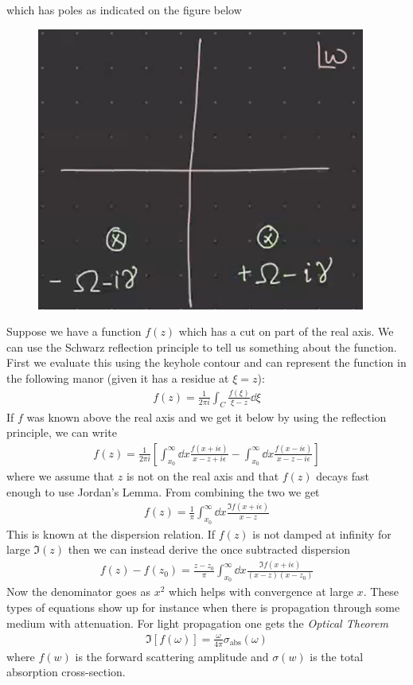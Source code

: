 \documentclass[a4paper,12pt]{article}
\begin{document}
which has poles as indicated on the figure below
\begin{figure}[H]
	\centering
	\includegraphics[width=0.3\linewidth]{23}
	\caption{}
	\label{fig:4}
\end{figure}
Suppose we have a function $f(z)$ which has a cut on part of the real axis. We can use the Schwarz reflection principle to tell us something about the function. First we evaluate this using the keyhole contour and can represent the function in the following manor (given it has a residue at $\xi=z$):
\begin{equation}
\begin{aligned}
f(z)=\frac{1}{2\pi i}\int_C \frac{f(\xi)}{\xi-z}\dd \xi
\end{aligned}
\end{equation}
If $f$ was known above the real axis and we get it below by using the reflection principle, we can write
\begin{equation}
	\begin{aligned}
		f(z)=\frac{1}{2\pi i}\left[\int_{x_0}^{\infty}\dd x \frac{f(x+i\epsilon)}{x-z+i\epsilon}-\int_{x_0}^{\infty}\dd x \frac{f(x-i\epsilon)}{x-z-i\epsilon}\right]
	\end{aligned}
\end{equation}
where we assume that $z$ is not on the real axis and that $f(z)$ decays fast enough to use Jordan's Lemma. From combining the two we get
\begin{equation}
	\begin{aligned}
		f(z)=\frac{1}{\pi}\int_{x_0}^{\infty}\dd x \frac{\Im f(x+i\epsilon)}{x-z}
	\end{aligned}
\end{equation}
This is known at the dispersion relation. If $f(z)$ is not damped at infinity for large $\Im(z)$ then we can instead derive the once subtracted dispersion
\begin{equation}
	\begin{aligned}
		f(z)-f(z_0)=\frac{z-z_0}{\pi}\int_{x_0}^{\infty}\dd x \frac{\Im f(x+i\epsilon)}{(x-z)(x-z_0)}
	\end{aligned}
\end{equation}
Now the denominator goes as $x^2$ which helps with convergence at large $x$. These types of equations show up for instance when there is propagation through some medium with attenuation. For light propagation one gets the \textit{Optical Theorem}
\begin{equation}
	\begin{aligned}
		\Im [f(\omega)]=\frac{\omega}{4\pi}\sigma_{\text{abs}}(\omega)
	\end{aligned}
\end{equation}
where $f(w)$ is the forward scattering amplitude and $\sigma(w)$ is the total absorption cross-section. 
\end{document}

